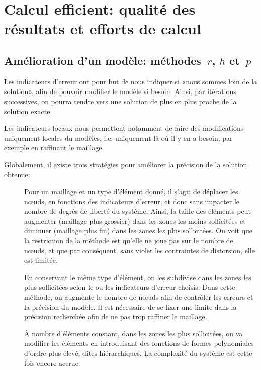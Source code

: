\chapter{Calcul efficient: qualité des résultats et efforts de calcul}\label{Ch-Amelio}


\medskip
\section{Amélioration d'un modèle: méthodes~$r$, $h$ et~$p$}\label{Sec-rhp}

Les indicateurs d'erreur ont pour but de nous indiquer si «nous sommes loin de la solution», afin de pouvoir modifier le modèle si besoin. Ainsi, par itérations successives, on pourra tendre vers une solution de plus en plus proche de la solution exacte.

Les indicateurs locaux nous permettent notamment de faire des modifications uniquement locales du modèles, i.e. uniquement là où il y en a besoin, par exemple en raffinant le maillage.

\medskip
Globalement, il existe trois stratégies pour améliorer la précision de la solution obtenue:
\begin{description}
\item[] Pour un maillage et un type d'élément donné, il s'agit de déplacer les nœuds, en fonctions des indicateurs d'erreur, et donc sans impacter le nombre de degrés de liberté du système. Ainsi, la taille des éléments peut augmenter (maillage plus grossier) dans les zones les moins sollicitées et diminuer (maillage plus fin) dans les zones les plus sollicitées. On voit que la restriction de la méthode est qu'elle ne joue pas sur le nombre de nœuds, et que par conséquent, sans violer les contraintes de distorsion, elle est limitée.
\item[] En conservant le même type d'élément, on les subdivise dans les zones les plus sollicitées selon le ou les indicateurs d'erreur choisis. Dans cette méthode, on augmente le nombre de nœuds afin de contrôler les erreurs et la précision du modèle. Il est nécessaire de se fixer une limite dans la précision recherchée afin de ne pas trop raffiner le maillage.
\item[] À nombre d'éléments constant, dans les zones les plus sollicitées, on va modifier les éléments en introduisant des fonctions de formes polynomiales d'ordre plus élevé, dites hiérarchiques. La complexité du système est cette fois encore accrue.
\end{description}

